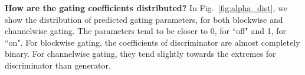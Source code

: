 \noindent \textbf{How are the gating coefficients distributed?} In Fig.~\ref{fig:alpha_dist}, we show the distribution of predicted gating parameters, for both blockwise and channelwise gating. The parameters tend to be closer to 0, for ``off" and 1, for ``on". For blockwise gating, the coefficients of discriminator are almost completely binary. For channelwise gating, they tend slightly towards the extremes for discriminator than generator. 








